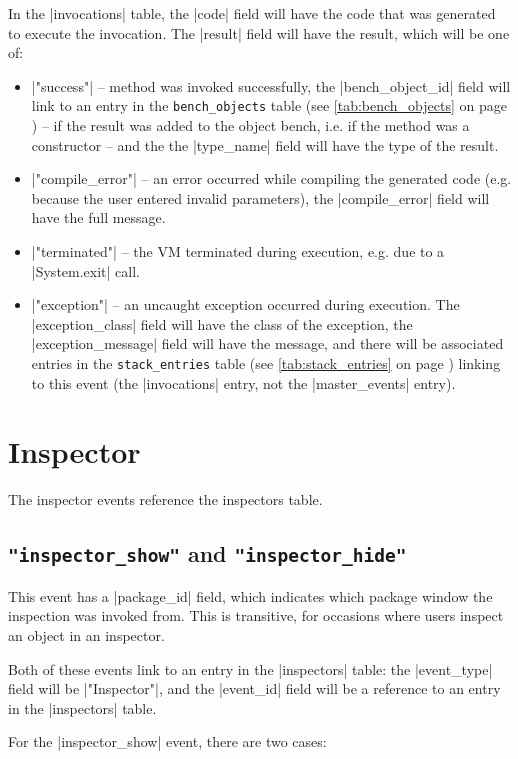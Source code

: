 \documentclass{report}
\newcommand{\myref}[1]{\autoref{#1} on page \pageref*{#1}}
\newcommand{\tabref}[1]{\lstinline|#1| table (see \myref{tab:#1})}
\begin{document}
In the |invocations| table, the |code| field will have the code that was generated
to execute the invocation.  The |result| field will have the result, which will be one of:

\begin{itemize}
\item |"success"| -- method was invoked successfully, the |bench_object_id|
  field will link to an entry in the \tabref{bench_objects} -- if the result was added to the
  object bench, i.e. if the method was a constructor -- and the the |type_name|
  field will have the type of the result.
\item |"compile_error"| -- an error occurred while compiling the generated code
  (e.g. because the user entered invalid parameters), the |compile_error|
  field will have the full message.
\item |"terminated"| -- the VM terminated during execution, e.g. due to a
  |System.exit| call.
\item |"exception"| -- an uncaught exception occurred during execution.  The
  |exception_class| field will have the class of the exception, the
  |exception_message| field will have the message, and there will be
  associated entries in the \tabref{stack_entries} linking to this event (the
  |invocations| entry, not the |master_events| entry).
\end{itemize}

\section{Inspector}

The inspector events reference the inspectors table.


\subsection{\lstinline!"inspector_show"! and \lstinline!"inspector_hide"!}

This event has a |package_id| field, which indicates which package window the
inspection was invoked from.  This is transitive, for occasions where users
inspect an object in an inspector.

Both of these events link to an entry in the |inspectors| table: the
|event_type| field will be |"Inspector"|, and the |event_id| field will be a
reference to an entry in the |inspectors| table.

For the |inspector_show| event, there are two cases:
\end{document}

